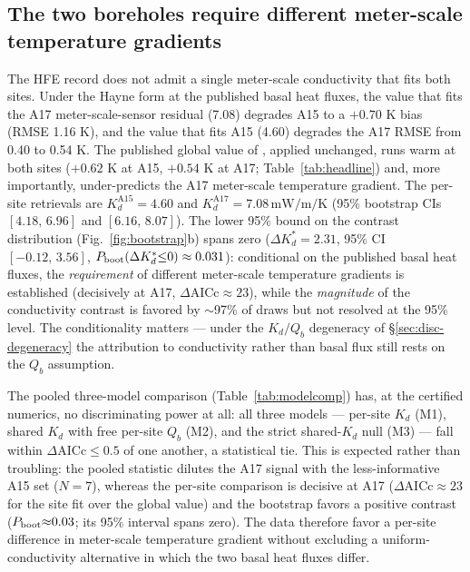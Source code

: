 \documentclass[11pt]{article}
\begin{document}
\subsection{The two boreholes require different meter-scale temperature gradients}%
\label{sec:disc-kd}
The HFE record does not admit a single meter-scale %
conductivity that fits both sites. Under the Hayne form at the published
basal heat fluxes, the value that fits the A17
meter-scale-sensor residual
(7.08) degrades
A15 to a $+0.70$ K bias (RMSE 1.16 K), and the value that
fits A15 (4.60) degrades the A17 RMSE from 0.40 to 0.54 K. The
published global value of \citet{hayne2017}, applied
unchanged, runs warm at both sites ($+0.62$ K at A15, $+0.54$ K at A17;
Table~\ref{tab:headline}) and, more importantly, under-predicts the
A17 meter-scale temperature gradient. The
per-site retrievals are $K_d^{\mathrm{A15}}=4.60$ and
$K_d^{\mathrm{A17}}=7.08\,\si{\milli\watt\per\meter\per\kelvin}$ (95\%
bootstrap CIs $[4.18,\,6.96]$
and $[6.16,\,8.07]$). The lower 95\% bound
on the contrast distribution (Fig.~\ref{fig:bootstrap}b)
spans zero
($\Delta K_d^{*}=2.31$, 95\% CI $[-0.12,\,3.56]$,
$P_{\rm boot}(\Delta K_d^{*}{\le}0)\approx 0.031$):
conditional on the published basal heat fluxes, the \emph{requirement} of
different meter-scale temperature gradients is established (decisively at
A17, $\Delta\mathrm{AICc}\approx 23$), while the \emph{magnitude} of the
conductivity contrast is favored by $\sim$97\% of draws but not resolved
at the 95\% level. The conditionality matters --- under the $K_d/Q_b$
degeneracy of \S\ref{sec:disc-degeneracy} the attribution to
conductivity rather than basal flux still rests on the $Q_b$
assumption.

The pooled three-model comparison (Table~\ref{tab:modelcomp})
has, at the certified
numerics, no discriminating power at all: all three models --- per-site
$K_d$ (M1), shared $K_d$ with free per-site $Q_b$ (M2), and the strict
shared-$K_d$ null (M3) --- fall within $\Delta\mathrm{AICc}\le 0.5$ of
one another, a statistical tie. This is expected rather than
troubling: the pooled statistic dilutes the A17 signal with the
less-informative A15 set ($N=7$), whereas the per-site comparison is
decisive at A17 ($\Delta\mathrm{AICc}\approx 23$ for the site fit over
the global value) and the bootstrap favors a positive
contrast ($P_{\rm boot}{\approx}0.03$; its 95\% interval spans zero). The
data therefore favor a per-site difference in
meter-scale temperature gradient without excluding a
uniform-conductivity alternative in which the two basal heat fluxes differ.
\end{document}
